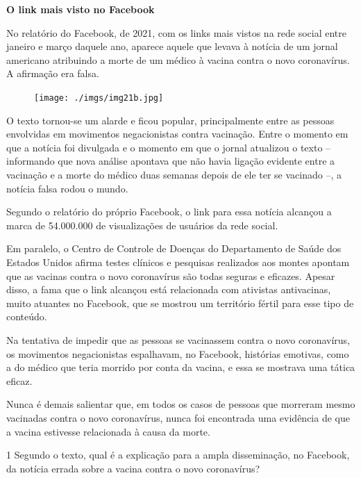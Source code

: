 \begin{myquote}
\textbf{O link mais visto no Facebook}

No relatório do Facebook, de 2021, com os links mais vistos na rede social
entre janeiro e março daquele ano, aparece aquele que levava à notícia
de um jornal americano atribuindo a morte de um médico à vacina contra
o novo coronavírus. A afirmação era falsa.

\begin{figure}
\texttt{[image: ./imgs/img21b.jpg]}
\end{figure}

O texto tornou-se um alarde e ficou popular, principalmente entre as pessoas
envolvidas em movimentos negacionistas contra vacinação. Entre o momento em
que a notícia foi divulgada e o momento em que o jornal atualizou o texto –
informando que nova análise apontava que não havia ligação evidente entre a
vacinação e a morte do médico duas semanas depois de ele ter se vacinado –,
a notícia falsa rodou o mundo.

Segundo o relatório do próprio Facebook, o link para essa notícia alcançou
a marca de 54.000.000 de visualizações de usuários da rede social.

Em paralelo, o Centro de Controle de Doenças do Departamento de Saúde dos Estados
Unidos afirma testes clínicos e pesquisas realizados aos montes apontam que as
vacinas contra o novo coronavírus são todas seguras e eficazes. Apesar disso, a
fama que o link alcançou está relacionada com ativistas antivacinas, muito atuantes
no Facebook, que se mostrou um território fértil para esse tipo de conteúdo.

Na tentativa de impedir que as pessoas se vacinassem contra o novo coronavírus,
os movimentos negacionistas espalhavam, no Facebook, histórias emotivas, como
a do médico que teria morrido por conta da vacina, e essa se mostrava uma
tática eficaz.

Nunca é demais salientar que, em todos os casos de pessoas que morreram
mesmo vacinadas contra o novo coronavírus, nunca foi encontrada uma evidência
de que a vacina estivesse relacionada à causa da morte.

\end{myquote}

\pagebreak
\num{1} Segundo o texto, qual é a explicação para a ampla
disseminação, no Facebook, da notícia errada sobre a vacina contra o novo coronavírus?

